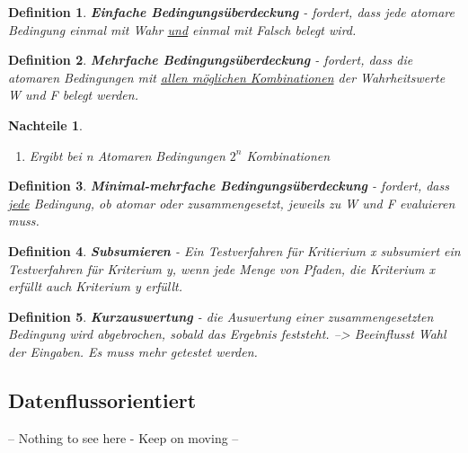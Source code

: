\documentclass[a4paper]{article}
\theoremstyle{break}
\newtheorem{defi}{Definition}[section]
\newtheorem{whynot}{Nachteile}[section]
\begin{document}
        \begin{defi}
          \textbf{Einfache Bedingungsüberdeckung} - fordert, dass jede atomare Bedingung einmal mit Wahr \ul{und} einmal mit Falsch belegt wird.
        \end{defi}

        \begin{defi}
          \textbf{Mehrfache Bedingungsüberdeckung} - fordert, dass die atomaren Bedingungen mit \ul{allen m\"oglichen Kombinationen} der Wahrheitswerte W und F belegt werden.
        \end{defi}

        \begin{whynot}
          \begin{enumerate}
          \item Ergibt bei n Atomaren Bedingungen \(2^n\) Kombinationen
          \end{enumerate}
        \end{whynot}

        \begin{defi}
          \textbf{Minimal-mehrfache Bedingungsüberdeckung} - fordert, dass \ul{jede} Bedingung, ob atomar oder zusammengesetzt, jeweils zu W und F evaluieren muss.
        \end{defi}

        \begin{defi}
          \textbf{Subsumieren} - Ein Testverfahren für Kritierium x subsumiert ein Testverfahren für Kriterium y, wenn jede Menge von Pfaden, die Kriterium x erfüllt auch Kriterium y erfüllt.
        \end{defi}

        
        \begin{defi}
          \textbf{Kurzauswertung} - die Auswertung einer zusammengesetzten Bedingung wird abgebrochen, sobald das Ergebnis feststeht.
          --> Beeinflusst Wahl der Eingaben. Es muss mehr getestet werden.
        \end{defi}
        
        \subsection{Datenflussorientiert}
        -- Nothing to see here - Keep on moving --
\end{document}
